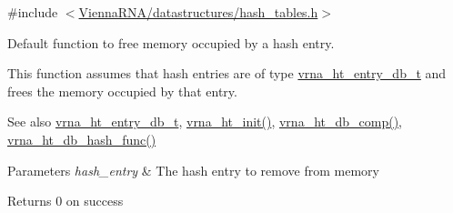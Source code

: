 {\ttfamily \#include $<$\mbox{\hyperlink{hash__tables_8h}{Vienna\+R\+N\+A/datastructures/hash\+\_\+tables.\+h}}$>$}



Default function to free memory occupied by a hash entry. 

This function assumes that hash entries are of type \mbox{\hyperlink{group__hash__table__utils_structvrna__ht__entry__db__t}{vrna\+\_\+ht\+\_\+entry\+\_\+db\+\_\+t}} and free\textquotesingle{}s the memory occupied by that entry.

\begin{DoxySeeAlso}{See also}
\mbox{\hyperlink{group__hash__table__utils_structvrna__ht__entry__db__t}{vrna\+\_\+ht\+\_\+entry\+\_\+db\+\_\+t}}, \mbox{\hyperlink{group__hash__table__utils_ga37d1c7e13087a2b7c1b87fda34577c29}{vrna\+\_\+ht\+\_\+init()}}, \mbox{\hyperlink{group__hash__table__utils_gac4ec0b8372d50d7347a63f140f340962}{vrna\+\_\+ht\+\_\+db\+\_\+comp()}}, \mbox{\hyperlink{group__hash__table__utils_gad133721a3cd2f8ca259fe315d86035a7}{vrna\+\_\+ht\+\_\+db\+\_\+hash\+\_\+func()}}
\end{DoxySeeAlso}

\begin{DoxyParams}{Parameters}
{\em hash\+\_\+entry} & The hash entry to remove from memory \\
\hline
\end{DoxyParams}
\begin{DoxyReturn}{Returns}
0 on success 
\end{DoxyReturn}
